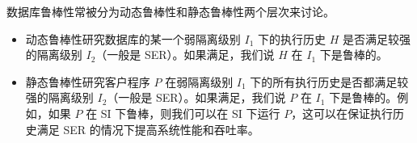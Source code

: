 
\begin{frame}{}
	数据库鲁棒性常被分为动态鲁棒性和静态鲁棒性两个层次来讨论。

	\begin{itemize}
		\item 动态鲁棒性研究数据库的某一个弱隔离级别 $I_1$ 下的执行历史 $H$ 是否满足较强的隔离级别 $I_2$（一般是 SER）。如果满足，我们说 $H$ 在 $I_1$ 下是鲁棒的。
		\item 静态鲁棒性研究客户程序 $P$ 在弱隔离级别 $I_1$ 下的所有执行历史是否都满足较强的隔离级别 $I_2$（一般是 SER）。如果满足，我们说 $P$ 在 $I_1$ 下是鲁棒的。例如，如果 $P$ 在 SI 下鲁棒，则我们可以在 SI 下运行 $P$，这可以在保证执行历史满足 SER 的情况下提高系统性能和吞吐率。
	\end{itemize}
\end{frame}

\begin{frame}{}
	
\end{frame}



